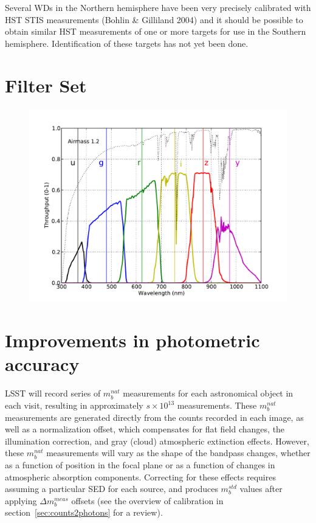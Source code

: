 \documentclass[12pt,preprint]{aastex}
\begin{document}
Several WDs in the Northern hemisphere have been very precisely
calibrated with HST STIS measurements (Bohlin \& Gilliland 2004) and
it should be possible to obtain similar HST measurements of one or
more targets for use in the Southern hemisphere. Identification of
these targets has not yet been done. 







\appendix

\newpage
\section{Filter Set}

\begin{figure}[h!]
\includegraphics[width=5in]{filters}
\end{figure}


\section{Improvements in photometric accuracy}
\label{sec:photo_better}

LSST will record series of $m_b^{nat}$ measurements for each
astronomical object in each visit, resulting in approximately
$s\times10^{13}$ measurements. These $m_b^{nat}$ measurements are
generated directly from the counts recorded in each image, as well as
a normalization offset, which compensates for flat field changes, the
illumination correction, and gray (cloud) atmospheric extinction
effects.  However, these $m_b^{nat}$ measurements will vary as the
shape of the bandpass changes, whether as a function of position in
the focal plane or as a function of changes in atmospheric absorption
components. Correcting for these effects requires assuming a
particular SED for each source, and produces $m_b^{std}$ values after
applying $\Delta m_b^{meas}$ offsets (see the overview of calibration
in section~\ref{sec:counts2photons} for a review). 
\end{document}
